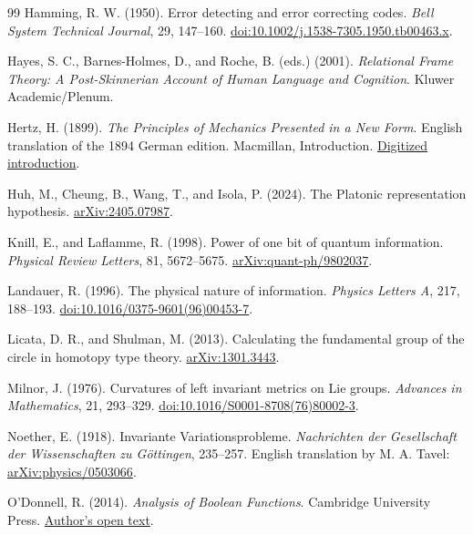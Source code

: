 \documentclass[11pt,a4paper]{article}
\begin{document}
\begin{thebibliography}{99}
Hamming, R. W. (1950). Error detecting and error correcting codes.
\emph{Bell System Technical Journal}, 29, 147--160.
\href{https://doi.org/10.1002/j.1538-7305.1950.tb00463.x}{doi:10.1002/j.1538-7305.1950.tb00463.x}.

Hayes, S. C., Barnes-Holmes, D., and Roche, B. (eds.) (2001).
\emph{Relational Frame Theory: A Post-Skinnerian Account of Human Language
and Cognition}. Kluwer Academic/Plenum.

Hertz, H. (1899). \emph{The Principles of Mechanics Presented in a New Form}.
English translation of the 1894 German edition. Macmillan, Introduction.
\href{https://en.wikisource.org/wiki/Page:The_principles_of_mechanics_presented_in_a_new_form_(Hertz,_1894).pdf/35}{Digitized introduction}.

Huh, M., Cheung, B., Wang, T., and Isola, P. (2024).
The Platonic representation hypothesis.
\href{https://arxiv.org/abs/2405.07987}{arXiv:2405.07987}.

Knill, E., and Laflamme, R. (1998). Power of one bit of quantum information.
\emph{Physical Review Letters}, 81, 5672--5675.
\href{https://arxiv.org/abs/quant-ph/9802037}{arXiv:quant-ph/9802037}.

Landauer, R. (1996). The physical nature of information.
\emph{Physics Letters A}, 217, 188--193.
\href{https://doi.org/10.1016/0375-9601(96)00453-7}{doi:10.1016/0375-9601(96)00453-7}.

Licata, D. R., and Shulman, M. (2013). Calculating the fundamental group of
the circle in homotopy type theory.
\href{https://arxiv.org/abs/1301.3443}{arXiv:1301.3443}.

Milnor, J. (1976). Curvatures of left invariant metrics on Lie groups.
\emph{Advances in Mathematics}, 21, 293--329.
\href{https://doi.org/10.1016/S0001-8708(76)80002-3}{doi:10.1016/S0001-8708(76)80002-3}.

Noether, E. (1918). Invariante Variationsprobleme.
\emph{Nachrichten der Gesellschaft der Wissenschaften zu G\"ottingen}, 235--257.
English translation by M. A. Tavel:
\href{https://arxiv.org/abs/physics/0503066}{arXiv:physics/0503066}.

O'Donnell, R. (2014). \emph{Analysis of Boolean Functions}.
Cambridge University Press.
\href{https://www.cs.cmu.edu/~odonnell/papers/Analysis-of-Boolean-Functions-by-Ryan-ODonnell.pdf}{Author's open text}.


\end{thebibliography}
\end{document}
